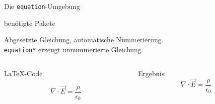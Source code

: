 \begin{frame}[fragile]{
  Die \texttt{equation}-Umgebung
  \hfill{}
}
  \begin{block}{benötigte Pakete}
    \begin{lstverbatim}
    \usepackage{amsmath}
    \usepackage{amssymb}
    \usepackage{mathtools}
    \end{lstverbatim}
  \end{block}
  Abgesetzte Gleichung, automatische Nummerierung. \\
  \texttt{equation*} erzeugt unnummerierte Gleichung.
  \begin{columns}[T]
    \begin{column}{0.6\textwidth}
      \begin{block}{\LaTeX-Code}
        \begin{lstverbatim}
        \begin{equation}
          \nabla \cdot \vec{E} =
          \frac{\rho} {\epsilon_0}
          \label{eq:maxwell1}
        \end{equation}
        \end{lstverbatim}
      \end{block}
    \end{column}
    \begin{column}{0.35\textwidth}
      \begin{block}{Ergebnis}
        \begin{equation}
          \nabla \cdot \vec{E} =
          \frac{\rho}{\epsilon_0}
          \label{eq:maxwell1}
        \end{equation}
      \end{block}
    \end{column}
  \end{columns}
\end{frame}

